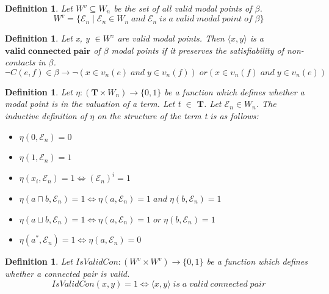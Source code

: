 \documentclass{article}
\newcommand\E{\mathcal{E}}
\newcommand\Tb{\mathbf{T}}
\newtheorem{defn}[theorem]{Definition}
\newcommand{\pair}[2]{ \langle #1, #2 \rangle }
\newcommand{\pairXY}{ \pair{x}{y} }
\begin{document}
		\begin{defn}\label{set-all-valid-modal-points}
			Let $W^v \subseteq W_n$ be the set of all valid modal points of $\beta$.
			\begin{equation}
				W^v = \{ \E_n \mid \E_n \in W_n \; and \; \E_n \; is \; a \; valid \; modal \; point \; of \; \beta \}
			\end{equation}
		\end{defn}

		\begin{defn}
			Let x, y $\in W^v$ are valid modal points. Then $\pairXY$ is a $\mathbf{valid \; connected \; pair}$ of $\beta$ modal points if it preserves the satisfiability of non-contacts in $\beta$.
			\begin{equation}
			\neg C(e, f) \in \beta \rightarrow
			\neg(x \in \upsilon_n(e) \; and \; y \in \upsilon_n(f)) \;  or
			(x \in \upsilon_n(f) \; and \; y \in \upsilon_n(e)) \;
			\end{equation}
		\end{defn}

		\begin{defn}
			\label{eta-valuation}
			Let $\eta: (\Tb \times W_n) \rightarrow \{0, 1 \}$ be a function which defines whether a modal point is in the valuation of a term. Let t $\in$ $\Tb$. Let $\E_n \in W_n$. The inductive definition of $\eta$ on the structure of the term t is as follows:
			\begin{itemize}
				\item $\eta(0, \E_n) = 0$
				\item $\eta(1, \E_n) = 1$
				\item $\eta(x_i, \E_n) = 1 \iff (\E_n)^i = 1$
				\item $\eta(a \sqcap b, \E_n) = 1 \iff \eta(a, \E_n) = 1 \; and \; \eta(b, \E_n) = 1$
				\item $\eta(a \sqcup b, \E_n) = 1 \iff \eta(a, \E_n) = 1 \; or \; \eta(b, \E_n) = 1$
				\item $\eta(a^*, \E_n) = 1 \iff \eta(a, \E_n) = 0$
			\end{itemize}
		\end{defn}

		\begin{defn}
			Let $IsValidCon: (W^v \times W^v) \rightarrow \{0, 1 \}$ be a function which defines whether a connected pair is valid.
			\begin{equation}
				IsValidCon(x,y) = 1 \iff \pairXY \; is \; a \; valid \; connected \; pair
			\end{equation}
		\end{defn}
\end{document}
